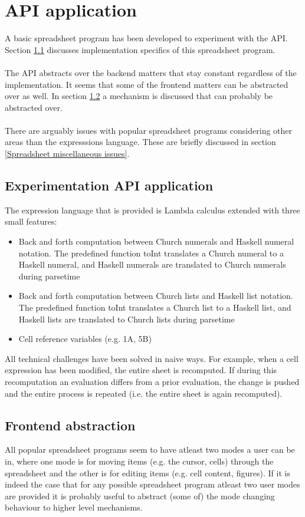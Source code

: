 \documentclass[10pt,a4paper]{article}
\begin{document}
\section{API application}
\label{API application}
A basic spreadsheet program has been developed to experiment with the API.
Section \ref{Experimentation API application} discusses implementation specifics of this
spreadsheet program.
\\\\
The API abstracts over the backend matters that stay constant regardless of the implementation.
It seems that some of the frontend matters can be abstracted over as well. In section
\ref{Frontend abstraction} a mechanism is discussed that can probably be abstracted over.
\\\\
There are arguably issues with popular spreadsheet programs considering other areas than the
expresssions language. These are briefly discussed in section \ref{Spreadsheet miscellaneous issues}.

\subsection{Experimentation API application}
\label{Experimentation API application}
The expression language that is provided is Lambda calculus extended with three small features:
\begin{itemize}
\item Back and forth computation between Church numerals and Haskell numeral notation. The predefined
function toInt translates a Church numeral to a Haskell numeral, and Haskell numerals are translated to
Church numerals during parsetime
\item Back and forth computation between Church lists and Haskell list notation. The predefined
function toInt translates a Church list to a Haskell list, and Haskell lists are translated to Church
lists during parsetime
\item Cell reference variables (e.g. 1A, 5B)
\end{itemize}
All technical challenges have been solved in naive ways.
For example, when a cell expression has been modified, the entire sheet is recomputed. If during
this recomputation an evaluation differs from a prior evaluation, the change is pushed and the entire
process is repeated (i.e. the entire sheet is again recomputed).

\subsection{Frontend abstraction}
\label{Frontend abstraction}
All popular spreadsheet programs seem to have atleast two modes a user can be in,
where one mode is for moving items (e.g. the cursor, cells) through the spreadsheet and the other
is for editing items (e.g. cell content, figures).
If it is indeed the case that for any possible spreadsheet program atleast two user modes are
provided it is probably useful to abstract (some of) the mode changing behaviour to higher level
mechanisms.
\end{document}
